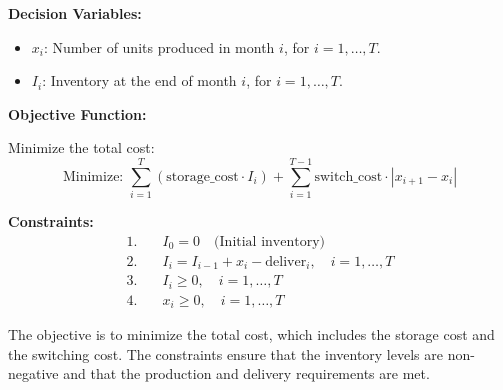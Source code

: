\documentclass{article}
\begin{document}
\textbf{Decision Variables:}
\begin{itemize}
    \item \( x_i \): Number of units produced in month \( i \), for \( i = 1, \ldots, T \).
    \item \( I_i \): Inventory at the end of month \( i \), for \( i = 1, \ldots, T \).
\end{itemize}

\textbf{Objective Function:}

Minimize the total cost:
\[
\text{Minimize: } \sum_{i=1}^{T} \left( \text{storage\_cost} \cdot I_i \right) + \sum_{i=1}^{T-1} \text{switch\_cost} \cdot |x_{i+1} - x_i|
\]

\textbf{Constraints:}
\begin{align*}
1. & \quad I_0 = 0 \quad \text{(Initial inventory)} \\
2. & \quad I_i = I_{i-1} + x_i - \text{deliver}_i, \quad i = 1, \ldots, T \\
3. & \quad I_i \geq 0, \quad i = 1, \ldots, T \\
4. & \quad x_i \geq 0, \quad i = 1, \ldots, T
\end{align*}

The objective is to minimize the total cost, which includes the storage cost and the switching cost. The constraints ensure that the inventory levels are non-negative and that the production and delivery requirements are met.
\end{document}
